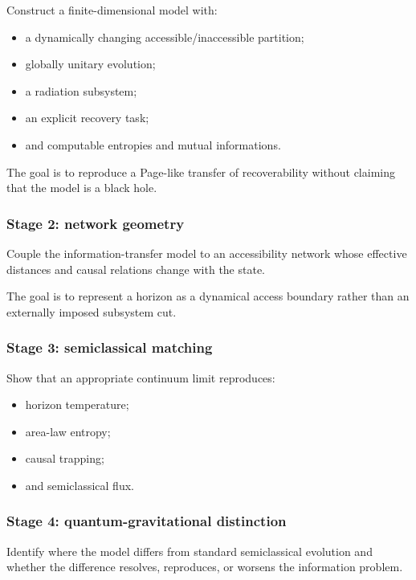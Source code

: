 \documentclass[
  11pt,
]{article}
\providecommand{\tightlist}{%
  \setlength{\itemsep}{0pt}\setlength{\parskip}{0pt}}
\begin{document}
Construct a finite-dimensional model with:

\begin{itemize}
\tightlist
\item
  a dynamically changing accessible/inaccessible partition;
\item
  globally unitary evolution;
\item
  a radiation subsystem;
\item
  an explicit recovery task;
\item
  and computable entropies and mutual informations.
\end{itemize}

The goal is to reproduce a Page-like transfer of recoverability without
claiming that the model is a black hole.

\subsubsection{Stage 2: network
geometry}\label{stage-2-network-geometry}

Couple the information-transfer model to an accessibility network whose
effective distances and causal relations change with the state.

The goal is to represent a horizon as a dynamical access boundary rather
than an externally imposed subsystem cut.

\subsubsection{Stage 3: semiclassical
matching}\label{stage-3-semiclassical-matching}

Show that an appropriate continuum limit reproduces:

\begin{itemize}
\tightlist
\item
  horizon temperature;
\item
  area-law entropy;
\item
  causal trapping;
\item
  and semiclassical flux.
\end{itemize}

\subsubsection{Stage 4: quantum-gravitational
distinction}\label{stage-4-quantum-gravitational-distinction}

Identify where the model differs from standard semiclassical evolution
and whether the difference resolves, reproduces, or worsens the
information problem.
\end{document}
